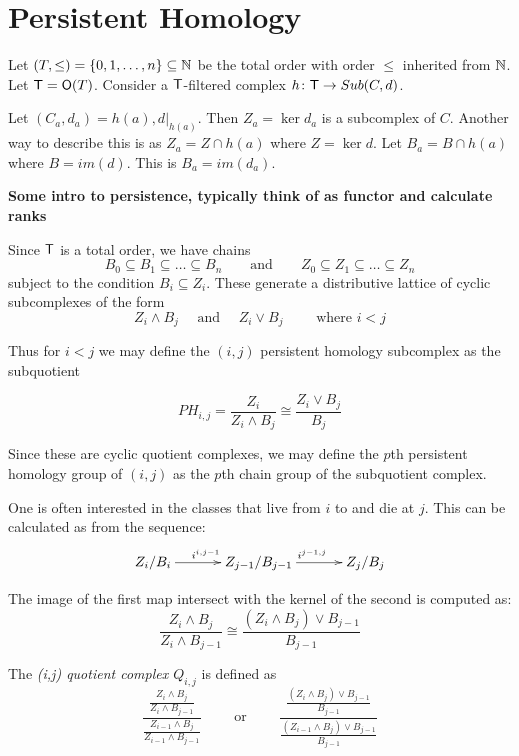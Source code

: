 
\section{Persistent Homology}\label{sec:PH}

Let $(T,\leq)=\{0,1,\ldots, n\}\subseteq {\mathbb{N}}$ be the total order with order $\leq$ inherited from ${\mathbb{N}}$.  Let ${\mathsf T}={\mathsf O}(T)$.  Consider a ${\mathsf T}$-filtered complex $h\colon {\mathsf T}\to Sub(C,d)$.  


Let $(C_a,d_a) = h(a),d|_{h(a)}$.  Then $Z_a= \ker d_a$ is a subcomplex of $C$.  Another way to describe this is as $Z_a = Z\cap h(a)$ where $Z=\ker d$.   Let $B_a = B\cap h(a)$ where $B=im(d)$.  This is $B_a = im(d_a)$.  

{\bf Some intro to persistence, typically think of as functor and calculate ranks}


Since ${\mathsf T}$ is a total order, we have chains 
\[
B_0\subseteq B_1\subseteq \ldots \subseteq  B_n\quad \quad\text{and} \quad\quad Z_0\subseteq Z_1 \subseteq \ldots \subseteq Z_n
\]
subject to the condition $B_i\subseteq Z_i$.  These generate a distributive lattice of cyclic subcomplexes of the form 
\[
Z_i\wedge B_j \quad\text{ and }\quad Z_i \vee B_j\quad\quad \text{ where $i<j$}
\]






Thus for $i<j$ we may define the $(i,j)$ persistent homology subcomplex as the subquotient

\[
PH_{i,j}= \frac{Z_i}{Z_i\wedge B_j} \cong \frac{Z_i\vee B_j}{B_j}
\]

Since these are cyclic quotient complexes, we may define the $p$th persistent homology group of $(i,j)$ as the $p$th chain group of the subquotient complex.

One is often interested in the classes that live from $i$ to and die at $j$.  This can be calculated as from the sequence:
\[
\xymatrixrowsep{0.03in}
\xymatrixcolsep{0.45in}
\xymatrix{
Z_i/B_i \ar[r]^{i^{i,j-1}} & Z_{j-1}/B_{j-1} \ar[r]^{i^{j-1,j}} & Z_j/B_j
}
\]

The image of the first map intersect with the kernel of the second is computed as:
\[
\frac{Z_i\wedge B_j}{Z_i\wedge B_{j-1}} \cong \frac{(Z_i\wedge B_j)\vee B_{j-1}}{B_{j-1}}
\]



The {\em (i,j) quotient complex $Q_{i,j}$} is defined as 
\[
\frac{\frac{Z_i\wedge B_j}{Z_i\wedge B_{j-1}} }{\frac{Z_{i-1}\wedge B_j}{Z_{i-1}\wedge B_{j-1}}} \quad\quad\text{ or }\quad\quad \frac{\frac{(Z_i\wedge B_j)\vee B_{j-1}}{B_{j-1}} } {\frac{(Z_{i-1}\wedge B_j)\vee B_{j-1}}{B_{j-1}}}
\]

